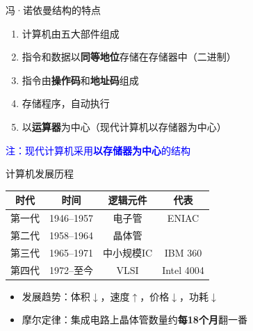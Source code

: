 \documentclass[10pt, aspectratio=169]{beamer}
\begin{document}
\begin{frame}{冯·诺依曼结构的特点}
    \begin{enumerate}
        \item 计算机由五大部件组成
        \item 指令和数据以\textbf{同等地位}存储在存储器中（二进制）
        \item 指令由\textbf{操作码}和\textbf{地址码}组成
        \item 存储程序，自动执行
        \item 以\textbf{运算器}为中心（现代计算机以存储器为中心）
    \end{enumerate}
    \vspace{0.5em}
    \begin{center}
        \textcolor{blue}{注：现代计算机采用\textbf{以存储器为中心}的结构}
    \end{center}
\end{frame}

\begin{frame}{计算机发展历程}
    \begin{tabular}{|c|c|c|c|}
        \hline
        \textbf{时代} & \textbf{时间} & \textbf{逻辑元件} & \textbf{代表} \\
        \hline
        第一代 & 1946--1957 & 电子管 & ENIAC \\
        \hline
        第二代 & 1958--1964 & 晶体管 &  \\
        \hline
        第三代 & 1965--1971 & 中小规模IC & IBM 360 \\
        \hline
        第四代 & 1972--至今 & VLSI & Intel 4004 \\
        \hline
    \end{tabular}
    \vspace{0.5em}
    \begin{itemize}
        \item 发展趋势：体积$\downarrow$，速度$\uparrow$，价格$\downarrow$，功耗$\downarrow$
        \item 摩尔定律：集成电路上晶体管数量约\textbf{每18个月}翻一番
    \end{itemize}
\end{frame}
\end{document}
